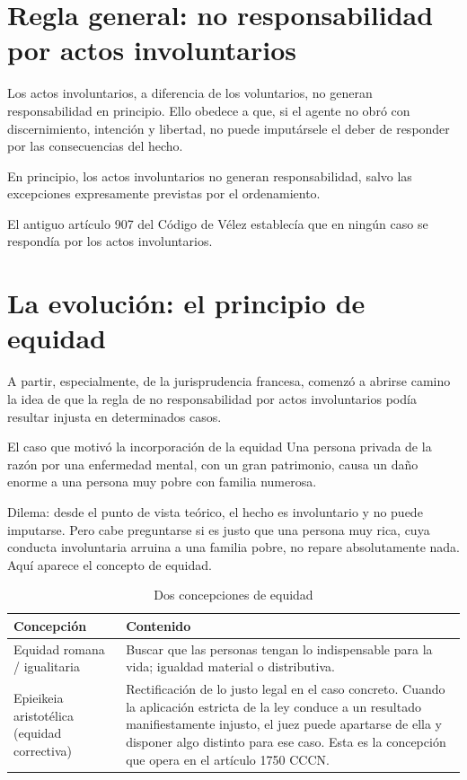 \documentclass[12pt,oneside]{book}
\begin{document}
\section{Regla general: no responsabilidad por actos involuntarios}

Los actos involuntarios, a diferencia de los voluntarios, no generan responsabilidad en principio. Ello obedece a que, si el agente no obró con discernimiento, intención y libertad, no puede imputársele el deber de responder por las consecuencias del hecho.

\begin{important}
En principio, los actos involuntarios no generan responsabilidad, salvo las excepciones expresamente previstas por el ordenamiento.
\end{important}

El antiguo artículo 907 del Código de Vélez establecía que en ningún caso se respondía por los actos involuntarios.

\section{La evolución: el principio de equidad}

A partir, especialmente, de la jurisprudencia francesa, comenzó a abrirse camino la idea de que la regla de no responsabilidad por actos involuntarios podía resultar injusta en determinados casos.

\begin{example}{El caso que motivó la incorporación de la equidad}
Una persona privada de la razón por una enfermedad mental, con un gran patrimonio, causa un daño enorme a una persona muy pobre con familia numerosa.

Dilema: desde el punto de vista teórico, el hecho es involuntario y no puede imputarse. Pero cabe preguntarse si es justo que una persona muy rica, cuya conducta involuntaria arruina a una familia pobre, no repare absolutamente nada. Aquí aparece el concepto de equidad.
\end{example}

\begin{table}[H]
\centering
\caption{Dos concepciones de equidad}
\begin{tabularx}{\textwidth}{l X}
\toprule
\textbf{Concepción} & \textbf{Contenido} \\
\midrule
Equidad romana / igualitaria & Buscar que las personas tengan lo indispensable para la vida; igualdad material o distributiva. \\
Epieikeia aristotélica (equidad correctiva) & Rectificación de lo justo legal en el caso concreto. Cuando la aplicación estricta de la ley conduce a un resultado manifiestamente injusto, el juez puede apartarse de ella y disponer algo distinto para ese caso. Esta es la concepción que opera en el artículo 1750 CCCN. \\
\bottomrule
\end{tabularx}
\end{table}
\end{document}
